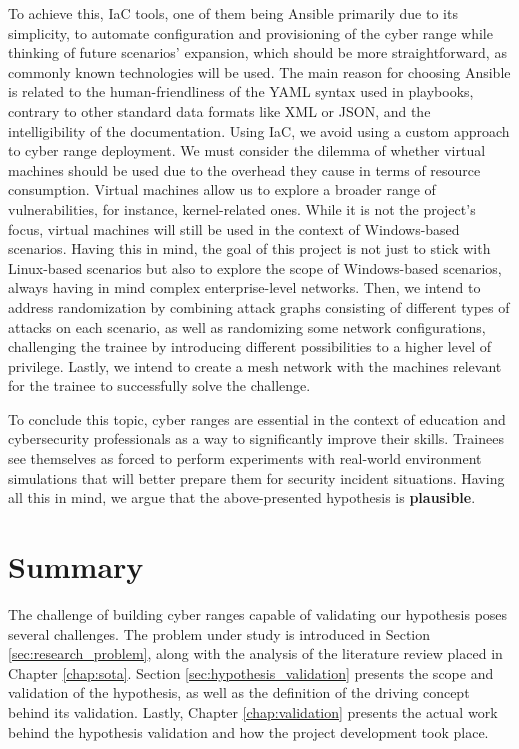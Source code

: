To achieve this, IaC tools, one of them being Ansible primarily due to its simplicity, to automate configuration and provisioning of the cyber range while thinking of future scenarios' expansion, which should be more straightforward, as commonly known technologies will be used. The main reason for choosing Ansible is related to the human-friendliness of the YAML syntax used in playbooks, contrary to other standard data formats like XML or JSON, and the intelligibility of the documentation. Using IaC, we avoid using a custom approach to cyber range deployment. We must consider the dilemma of whether virtual machines should be used due to the overhead they cause in terms of resource consumption. Virtual machines allow us to explore a broader range of vulnerabilities, for instance, kernel-related ones. While it is not the project's focus, virtual machines will still be used in the context of Windows-based scenarios. Having this in mind, the goal of this project is not just to stick with Linux-based scenarios but also to explore the scope of Windows-based scenarios, always having in mind complex enterprise-level networks. Then, we intend to address randomization by combining attack graphs consisting of different types of attacks on each scenario, as well as randomizing some network configurations, challenging the trainee by introducing different possibilities to a higher level of privilege. Lastly, we intend to create a mesh network with the machines relevant for the trainee to successfully solve the challenge.

To conclude this topic, cyber ranges are essential in the context of education and cybersecurity professionals as a way to significantly improve their skills. Trainees see themselves as forced to perform experiments with real-world environment simulations that will better prepare them for security incident situations. Having all this in mind, we argue that the above-presented hypothesis is \textbf{plausible}.

\section{Summary} \label{sec:problem_summary}

The challenge of building cyber ranges capable of validating our hypothesis poses several challenges. The problem under study is introduced in Section \ref{sec:research_problem}, along with the analysis of the literature review placed in Chapter \ref{chap:sota}. Section \ref{sec:hypothesis_validation} presents the scope and validation of the hypothesis, as well as the definition of the driving concept behind its validation. Lastly, Chapter \ref{chap:validation} presents the actual work behind the hypothesis validation and how the project development took place.